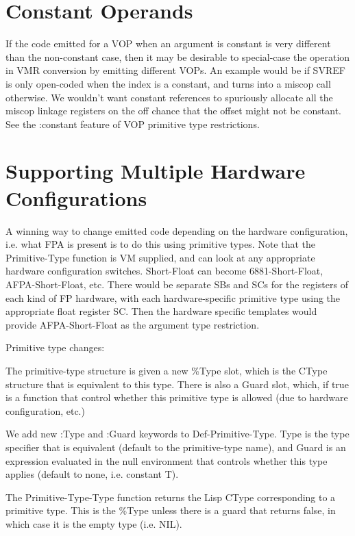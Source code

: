 
\section{Constant Operands}

If the code emitted for a VOP when an argument is constant is very different
than the non-constant case, then it may be desirable to special-case the
operation in VMR conversion by emitting different VOPs.  An example would be if
SVREF is only open-coded when the index is a constant, and turns into a miscop
call otherwise.  We wouldn't want constant references to spuriously allocate
all the miscop linkage registers on the off chance that the offset might not be
constant.  See the :constant feature of VOP primitive type restrictions.


\section{Supporting Multiple Hardware Configurations}


A winning way to change emitted code depending on the hardware configuration,
i.e. what FPA is present is to do this using primitive types.  Note that the
Primitive-Type function is VM supplied, and can look at any appropriate
hardware configuration switches.  Short-Float can become 6881-Short-Float,
AFPA-Short-Float, etc.  There would be separate SBs and SCs for the registers
of each kind of FP hardware, with each hardware-specific primitive type
using the appropriate float register SC.  Then the hardware specific templates
would provide AFPA-Short-Float as the argument type restriction.

Primitive type changes:

The primitive-type structure is given a new \%Type slot, which is the CType
structure that is equivalent to this type.  There is also a Guard slot, which,
if true is a function that control whether this primitive type is allowed (due
to hardware configuration, etc.)  

We add new :Type and :Guard keywords to Def-Primitive-Type.  Type is the type
specifier that is equivalent (default to the primitive-type name), and Guard is
an expression evaluated in the null environment that controls whether this type
applies (default to none, i.e. constant T).

The Primitive-Type-Type function returns the Lisp CType corresponding to a
primitive type.  This is the \%Type unless there is a guard that returns false,
in which case it is the empty type (i.e. NIL).

